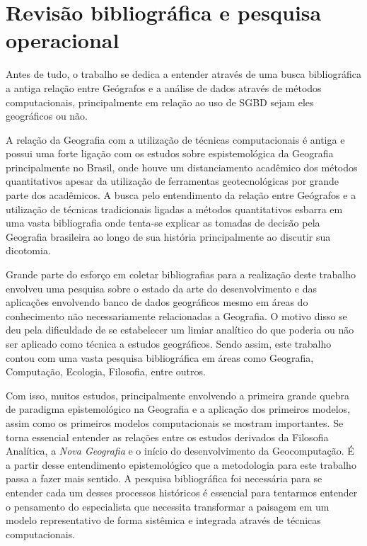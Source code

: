 \chapter{Revisão bibliográfica e pesquisa operacional}
Antes de tudo, o trabalho se dedica a entender através de uma busca bibliográfica a antiga relação entre Geógrafos e a análise de dados através de métodos computacionais, principalmente em relação ao uso de SGBD sejam eles geográficos ou não. 

A relação da Geografia com a utilização de técnicas computacionais é antiga e possui uma forte ligação com os estudos sobre espistemológica da Geografia principalmente no Brasil, onde houve um distanciamento acadêmico dos métodos quantitativos apesar da utilização de ferramentas geotecnológicas por grande parte dos acadêmicos. A busca pelo entendimento da relação entre Geógrafos e a utilização de técnicas tradicionais ligadas a métodos quantitativos esbarra em uma vasta bibliografia onde tenta-se explicar as tomadas de decisão pela Geografia brasileira ao longo de sua história principalmente ao discutir sua dicotomia. 

Grande parte do esforço em coletar bibliografias para a realização deste trabalho envolveu uma pesquisa sobre o estado da arte do desenvolvimento e das aplicações envolvendo banco de dados geográficos mesmo em áreas do conhecimento não necessariamente relacionadas a Geografia. O motivo disso se deu pela dificuldade de se estabelecer um limiar analítico do que poderia ou não ser aplicado como técnica a estudos geográficos. Sendo assim, este trabalho contou com uma vasta pesquisa bibliográfica em áreas como Geografia, Computação, Ecologia, Filosofia, entre outros. 

Com isso, muitos estudos, principalmente envolvendo a primeira grande quebra de paradigma epistemológico na Geografia e a aplicação dos primeiros modelos, assim como os primeiros modelos computacionais se mostram importantes. Se torna essencial entender as relações entre os estudos derivados da Filosofia Analítica, a \textit{Nova Geografia} e o início do desenvolvimento da Geocomputação. É a partir desse entendimento epistemológico que a metodologia para este trabalho passa a fazer mais sentido. A pesquisa bibliográfica foi necessária para se entender cada um desses processos históricos é essencial para tentarmos entender o pensamento do especialista que necessita transformar a paisagem em um modelo representativo de forma sistêmica e integrada através de técnicas computacionais. 


